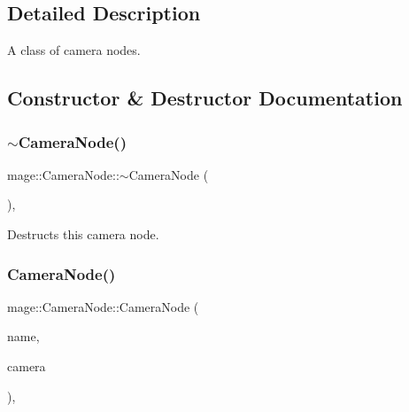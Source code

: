 \subsection{Detailed Description}
A class of camera nodes. 

\subsection{Constructor \& Destructor Documentation}
\hypertarget{classmage_1_1_camera_node_ac6612668e7b9f829e371794d422d357f}{}\label{classmage_1_1_camera_node_ac6612668e7b9f829e371794d422d357f} 
\subsubsection{\texorpdfstring{$\sim$\+Camera\+Node()}{~CameraNode()}}
{\footnotesize\ttfamily mage\+::\+Camera\+Node\+::$\sim$\+Camera\+Node (\begin{DoxyParamCaption}{ }\end{DoxyParamCaption})\hspace{0.3cm}{\ttfamily [virtual]}, {\ttfamily [default]}}

Destructs this camera node. \hypertarget{classmage_1_1_camera_node_a943cecfc5f96ad22f0f64d0f7b3f3640}{}\label{classmage_1_1_camera_node_a943cecfc5f96ad22f0f64d0f7b3f3640} 
\subsubsection{\texorpdfstring{Camera\+Node()}{CameraNode()}\hspace{0.1cm}{\footnotesize\ttfamily [1/3]}}
{\footnotesize\ttfamily mage\+::\+Camera\+Node\+::\+Camera\+Node (\begin{DoxyParamCaption}\item[{const string \&}]{name,  }\item[{\hyperlink{namespacemage_a3316d7143a973e37adf1110f2e80ca31}{Unique\+Ptr}$<$ \hyperlink{classmage_1_1_camera}{Camera} $>$ \&\&}]{camera }\end{DoxyParamCaption})\hspace{0.3cm}{\ttfamily [explicit]}, {\ttfamily [protected]}}

